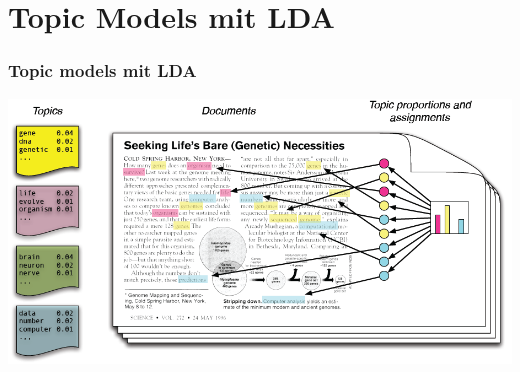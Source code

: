 \documentclass[12pt, xcolor=table]{beamer}
\begin{document}
\section{Topic Models mit LDA}
\begin{frame}
    \frametitle{Topic models mit LDA}
    \begin{center}
        \includegraphics[scale=0.35]{figures/IntroToLDA.png}
    \end{center}
\end{frame}
\end{document}
